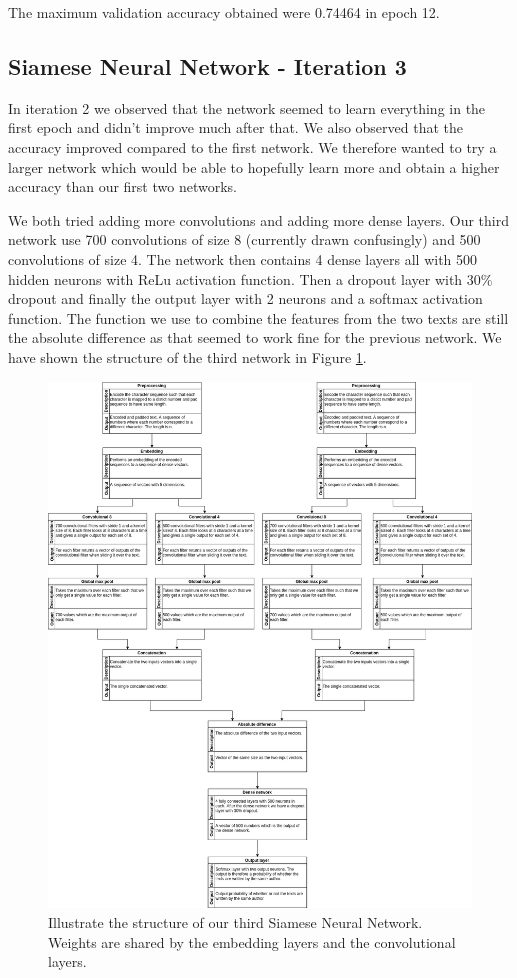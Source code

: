 The maximum validation accuracy obtained were 0.74464 in epoch 12.


\subsection{Siamese Neural Network - Iteration 3}

In iteration 2 we observed that the network seemed to learn everything in the
first epoch and didn't improve much after that. We also observed that the
accuracy improved compared to the first network. We therefore wanted to try a
larger network which would be able to hopefully learn more and obtain a higher
accuracy than our first two networks.

We both tried adding more convolutions and adding more dense layers. Our third
network use 700 convolutions of size 8 (currently drawn confusingly) and 500
convolutions of size 4. The network then contains 4 dense layers all with 500
hidden neurons with \gls{ReLu} activation function. Then a dropout layer with
30\% dropout and finally the output layer with 2 neurons and a softmax
activation function. The function we use to combine the features from the two
texts are still the absolute difference as that seemed to work fine for the
previous network. We have shown the structure of the third network in Figure
\ref{fig:network3}.

\begin{figure}
    \centering
    \includegraphics[width=\textwidth]{./pictures/experiments/network3.png}
    \caption{Illustrate the structure of our third Siamese Neural Network.
        Weights are shared by the embedding layers and the convolutional
        layers.}
    \label{fig:network3}
\end{figure}

